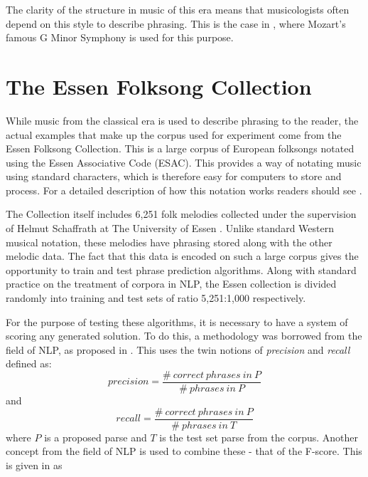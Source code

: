 \documentclass[a4paper,12pt]{article}
\begin{document}
The clarity of the structure in music of this era means that musicologists often depend on this style to describe phrasing. This is the case in \cite{Bod_probabilisticgrammars}, where Mozart's famous G Minor Symphony is used for this purpose.




\section{The Essen Folksong Collection}
\label{essensec}

While music from the classical era is used to describe phrasing to the reader, the actual examples that make up the corpus used for experiment come from the Essen Folksong Collection. This is a large corpus of European folksongs notated using the Essen Associative Code (ESAC). This provides a way of notating music using standard characters, which is therefore easy for computers to store and process. For a detailed description of how this notation works readers should see \cite{Bod_probabilisticgrammars}.

The Collection itself includes 6,251 folk melodies collected under the supervision of Helmut Schaffrath at The University of Essen \cite{essen}. Unlike standard Western musical notation, these melodies have phrasing stored along with the other melodic data. The fact that this data is encoded on such a large corpus gives the opportunity to train and test phrase prediction algorithms. Along with standard practice on the treatment of corpora in NLP, the Essen collection is divided randomly into training and test sets of ratio 5,251:1,000 respectively.  

For the purpose of testing these algorithms, it is necessary to have a system of scoring any generated solution. To do this, a methodology was borrowed from the field of NLP, as proposed in \cite{nlp-score}. This uses the twin notions of \emph{precision} and \emph{recall} defined as:
$$precision = \frac{\#\ correct\ phrases\ in\ P}{\#\ phrases\ in\ P} $$
and
$$recall = \frac{\#\ correct\ phrases\ in\ P}{\#\ phrases\ in\ T} $$
where $P$ is a proposed parse and $T$ is the test set parse from the corpus. Another concept from the field of NLP is used to combine these - that of the F-score. This is given in \cite{manning} as
\end{document}
